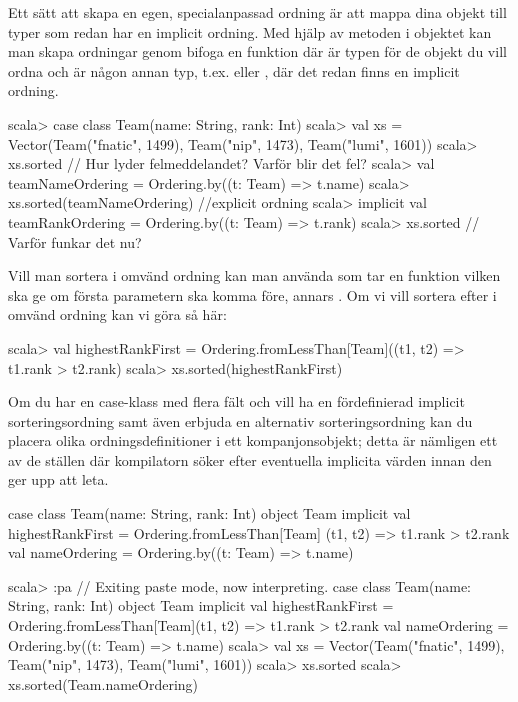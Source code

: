 \Subtask Ett sätt att skapa en egen, specialanpassad ordning är att mappa dina objekt till typer som redan har en implicit ordning. Med hjälp av metoden  i objektet  kan man skapa ordningar genom bifoga en funktion  där  är typen för de objekt du vill ordna och  är någon annan typ, t.ex.  eller , där det redan finns en implicit ordning.
\begin{REPL}
scala> case class Team(name: String, rank: Int)
scala> val xs =
         Vector(Team("fnatic", 1499), Team("nip", 1473), Team("lumi", 1601))
scala> xs.sorted  // Hur lyder felmeddelandet? Varför blir det fel?
scala> val teamNameOrdering = Ordering.by((t: Team) => t.name)
scala> xs.sorted(teamNameOrdering)   //explicit ordning
scala> implicit val teamRankOrdering = Ordering.by((t: Team) => t.rank)
scala> xs.sorted   // Varför funkar det nu?
\end{REPL}

\Subtask Vill man sortera i omvänd ordning kan man använda
 som tar en funktion  vilken ska ge  om första parametern ska komma före, annars . Om vi vill sortera efter  i omvänd ordning kan vi göra så här:
\begin{REPL}
scala> val highestRankFirst =
         Ordering.fromLessThan[Team]((t1, t2) => t1.rank > t2.rank)
scala> xs.sorted(highestRankFirst)
\end{REPL}

\Subtask Om du har en case-klass med flera fält och vill ha en fördefinierad implicit sorteringsordning samt även erbjuda en alternativ sorteringsordning kan du placera olika ordningsdefinitioner i ett kompanjonsobjekt; detta är nämligen ett av de ställen där kompilatorn söker efter eventuella implicita värden innan den ger upp att leta.
\begin{Code}
case class Team(name: String, rank: Int)
object Team {
  implicit val highestRankFirst = Ordering.fromLessThan[Team]{
    (t1, t2) => t1.rank > t2.rank
  }
  val nameOrdering = Ordering.by((t: Team) => t.name)
}
\end{Code}
\begin{REPL}
scala> :pa
// Exiting paste mode, now interpreting.
case class Team(name: String, rank: Int)
object Team {
  implicit val highestRankFirst =
    Ordering.fromLessThan[Team]{(t1, t2) => t1.rank > t2.rank}
  val nameOrdering = Ordering.by((t: Team) => t.name)
}
scala> val xs =
         Vector(Team("fnatic", 1499), Team("nip", 1473), Team("lumi", 1601))
scala> xs.sorted
scala> xs.sorted(Team.nameOrdering)
\end{REPL}



